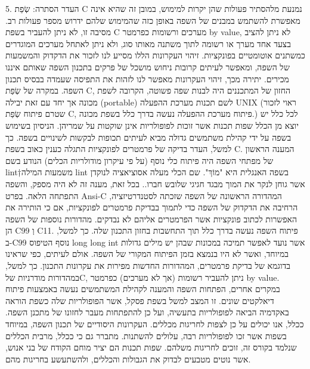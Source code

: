 \begin{ציינון}
      5. העדר הסתרה: שְׂפַת C נמנעת מלהסתיר פעולות שהן יקרות למימוש, במובן זה שהיא אינה מאפשרת להשתמש במבנים של השפה באופן כזה שהמימוש שלהם ידרוש מספר פעולות רב. מסיבה זו, לא ניתן להעביר בשפת C מערכים ורשומות כפרמטר by value, לא ניתן להציב בצעד אחד מערך או רשומה לתוך משתנה מאותו סוג, ולא ניתן לאתחל מערכים המוגדרים כמשתנים אוטומטיים בפונקציות.
      זיהוי העקרונות הללו מסייע לנו לזכור את הדקדוק והמשמעות של השפה, ומאפשר לעיתים קרובות ניחוש מושכל של פרקים בתכנון השפה שאותם איננו מכירים. יתירה מכך, זיהוי העקרונות מאפשר לנו לזהות את התפיסה שעמדה בבסיס תכנון השפה. במקרה של שְׂפַת C, החזון של המתכננים היה לבנות שפה פשוטה, הקרובה לשפת מכונה אך יחד עם זאת יבילה (portable) לשם תכנות מערכת ההפעלה UNIX (ראוי לזכור שטרם פיתוח שְׂפַת C, פיתוח מערכת ההפעלה נעשה בדרך כלל בשפת מכונה.)
      לכל כלל יש יוצא מן הכלל
      שפות תכנות אשר זוכות לפופולריות אינן שוקטות על שמריהן. הניסיון בשימוש בשפה על ידי קהילת משתמשים גדולה מביא לעיתים תכופות לבקשות לשינויים בשפה. כך למשל, העדר בדיקה של פרמטרים לפונקציות התגלה כענין כאוב בשפת C. המענה הראשון של מפתחי השפה היה פיתוח כלי נוסף (על פי עיקרון מודולריות הכלים) הנודע בשם lint†{משמעות המילה lint בשפה האנגלית היא "מוֹךְ". שם הכלי מעלה אסוציאציה לנוקדן אשר גוחן לנקר את המוך מבגד חגיגי שלובש חברו.}. בכל זאת, מענה זה לא היה מספק, והשפה התפתחה הלאה. בפרט Ansi-C המהדורה הראשונה של השפה שזכתה לסטנדרטיזציה, הרחיבה את הדקדוק של השפה כדי לתמוך בבדיקת פרמטרים לפונקציות, אם כי הותירה את האפשרות לכתוב פונקציות אשר הפרמטרים אליהם לא נבדקים. מהדורות נוספות של השפה הן C99 וְ C11.
      פיתוח השפה נעשה בדרך כלל תוך התחשבות בחזון התכנון שלה. כך למשל, ב-C99 נוסף הטיפוס
      long long int
      אשר נועד לאפשר תמיכה במכונות שבהן יש מילים גדולות במיוחד, ואשר לא היו בנמצא בזמן הפיתוח המקורי של השפה. אולם לעיתים, כפי שראינו בדוגמא של בדיקת פרמטרים, המהדורות החדשות מפירות את עקרונות התכנון. כך למשל, במהדורות מודרניות שלC, ניתן להעביר רשומות (אך לא מערכים) כפרמטר by value.
      במקרים אחרים, הפתחות השפה והמענה לקהילת המשתמשים נעשה באמצעות פיתוח דיאלקטים שונים. זו המצב למשל בשפת פסקל, אשר הפופולריות שלה כשפת הוראה באקדמיה הביאה לפופולריות בתעשיה, ועל כן להתפתחות מעבר לחזונו של מתכנן השפה.
      ככלל, אנו יכולים על כן לצפות לחריגות מכללים. העקרונות היסודיים של תכנון השפה, במיוחד בשפות אשר זכו לפופולריות רבה, עלולים להשתנות. מתברר גם כי ככלל, מרבית הכללים שנלמד בקורס זה, זוכים לחריגות משלהם. שפות תכנות הם יציר מוחם הקודח של בני אנוש, אשר נוטים מטבעים לבדוק את הגבולות והכללים, ולהשתעשע בחריגות מהם.
  \end{ציינון}

